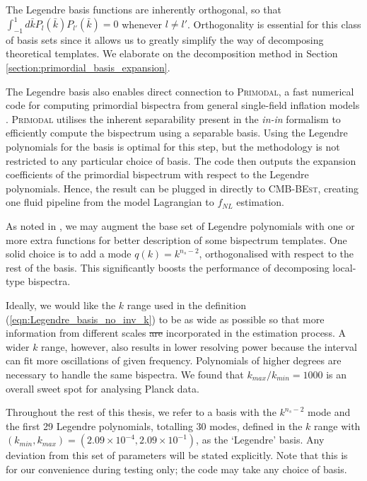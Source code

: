 \documentclass[a4paper,12pt,times,custombib,print,index]{Classes/PhDThesisPSnPDF} %
\providecommand{\DIFadd}[1]{{\protect\color{blue}\uwave{#1}}} %
\providecommand{\DIFdel}[1]{{\protect\color{red}\sout{#1}}}                      %
\providecommand{\DIFaddbegin}{} %
\providecommand{\DIFaddend}{} %
\providecommand{\DIFdelbegin}{} %
\providecommand{\DIFdelend}{} %
\newcommand{\DIFscaledelfig}{0.5}
\newlength{\DIFdelgraphicswidth} %
\newlength{\DIFdelgraphicsheight} %
\newcommand{\DIFaddincludegraphics}[2][]{{\color{blue}\fbox{\DIFOincludegraphics[#1]{#2}}}} %
\newcommand{\DIFdelincludegraphics}[2][]{%
\sbox{\DIFdelgraphicsbox}{\DIFOincludegraphics[#1]{#2}}%
\settoboxwidth{\DIFdelgraphicswidth}{\DIFdelgraphicsbox} %
\settoboxtotalheight{\DIFdelgraphicsheight}{\DIFdelgraphicsbox} %
\scalebox{\DIFscaledelfig}{%
\parbox[b]{\DIFdelgraphicswidth}{\usebox{\DIFdelgraphicsbox}\\[-\baselineskip] \rule{\DIFdelgraphicswidth}{0em}}\llap{\resizebox{\DIFdelgraphicswidth}{\DIFdelgraphicsheight}{%
\setlength{\unitlength}{\DIFdelgraphicswidth}%
\begin{picture}(1,1)%
\thicklines\linethickness{2pt} %
{\color[rgb]{1,0,0}\put(0,0){\framebox(1,1){}}}%
{\color[rgb]{1,0,0}\put(0,0){\line( 1,1){1}}}%
{\color[rgb]{1,0,0}\put(0,1){\line(1,-1){1}}}%
\end{picture}%
}\hspace*{3pt}}} %
} %
\DeclareRobustCommand{\DIFaddbegin}{\DIFOaddbegin \let\includegraphics\DIFaddincludegraphics} %
\DeclareRobustCommand{\DIFaddend}{\DIFOaddend \let\includegraphics\DIFOincludegraphics} %
\DeclareRobustCommand{\DIFdelbegin}{\DIFOdelbegin \let\includegraphics\DIFdelincludegraphics} %
\DeclareRobustCommand{\DIFdelend}{\DIFOaddend \let\includegraphics\DIFOincludegraphics} %
\begin{document}
The Legendre basis functions are inherently orthogonal, so that $\int_{-1}^{1} d\bar{k} P_{l}(\bar{k}) P_{l'}(\bar{k}) = 0$ whenever $l \neq l'$. Orthogonality is essential for this class of basis sets since it allows us to greatly simplify the way of decomposing theoretical templates. We elaborate on the decomposition method in Section \ref{section:primordial_basis_expansion}. 

The Legendre basis also enables direct connection to \textsc{Primodal}, a fast numerical code for computing primordial bispectra from general single-field inflation models \cite{Clarke2021}. \textsc{Primodal} utilises the inherent separability present in the \textit{in-in} formalism to efficiently compute the bispectrum using a separable basis. Using the Legendre polynomials for the basis is optimal for this step, but the methodology is not restricted to any particular choice of basis. The code then outputs the expansion coefficients of the primordial bispectrum with respect to the Legendre polynomials. Hence, the result can be plugged in directly to \textsc{CMB-BEst}, creating one fluid pipeline from the model Lagrangian to \DIFdelbegin \DIFdel{$f_{NL}$ }\DIFdelend \DIFaddbegin \DIFadd{$f_\text{NL}$ }\DIFaddend estimation.

As noted in \cite{Clarke2021}, we may augment the base set of Legendre polynomials with one or more extra functions for \DIFaddbegin \DIFadd{a }\DIFaddend better description of some bispectrum templates. One solid choice is to add a mode \DIFdelbegin \DIFdel{$q(k) = k^{n_s -2}$}\DIFdelend \DIFaddbegin \DIFadd{$q(k) = k^{n_\text{s} -2}$}\DIFaddend , orthogonalised with respect to the rest of the basis. This significantly boosts the performance of decomposing local-type bispectra.

Ideally, we would like the $k$ range used in the definition (\ref{eqn:Legendre_basis_no_inv_k}) to be as wide as possible so that more information from different scales \DIFdelbegin \DIFdel{are }\DIFdelend \DIFaddbegin \DIFadd{is }\DIFaddend incorporated in the estimation process. A wider $k$ range, however, also results in lower resolving power because the interval can fit more oscillations of \DIFaddbegin \DIFadd{a }\DIFaddend given frequency. Polynomials of higher degrees are necessary to handle the same bispectra. We found that \DIFdelbegin \DIFdel{$k_{max}/k_{min} = 1000$ }\DIFdelend \DIFaddbegin \DIFadd{$k_\text{max}/k_\text{min} = 1000$ }\DIFaddend is an overall sweet spot for analysing Planck data.

Throughout the rest of this thesis, we refer to a basis with the \DIFdelbegin \DIFdel{$k^{n_s - 2}$ }\DIFdelend \DIFaddbegin \DIFadd{$k^{n_\text{s} - 2}$ }\DIFaddend mode and the first 29 Legendre polynomials, totalling 30 modes, defined in the $k$ range with \DIFdelbegin \DIFdel{$(k_{min}, k_{max}) = (2.09 \times 10^{-4}, 2.09 \times 10^{-1})$}\DIFdelend \DIFaddbegin \DIFadd{$(k_\text{min}, k_\text{max}) = (2.09 \times 10^{-4}, 2.09 \times 10^{-1})$}\DIFaddend , as the `Legendre' basis. Any deviation from this set of parameters will be stated explicitly. Note that this is for our convenience during testing only; the code may take any choice of basis.
\end{document}
